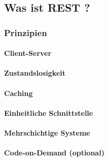 \subsection{Was ist REST ?}
\label{Was ist REST ?}



\subsubsection{Prinzipien}
  \label{Prinzipien}
\pagebreak

\paragraph{Client-Server}
\label{Client-Server}

\pagebreak

\paragraph{Zustandslosigkeit}
\label{Zustandslosigkeit}

\pagebreak


\paragraph{Caching}
\label{Caching}

\pagebreak

\paragraph{Einheitliche Schnittstelle}
\label{Einheitliche Schnittstelle}

\pagebreak

\paragraph{Mehrschichtige Systeme}
\label{Mehrschichtige Systeme}

\pagebreak

\paragraph{Code-on-Demand (optional)}
\label{Code-on-Demand}

\pagebreak

